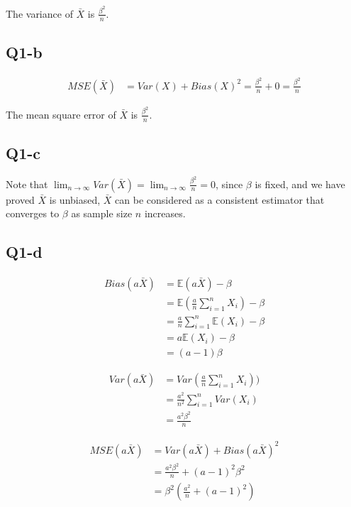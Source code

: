 \documentclass[12pt,letterpaper]{article}
\begin{document}
\noindent The variance of $\bar{X}$ is $\frac{\beta^2}{n}$.

\subsection*{Q1-b}

\begin{align*}
MSE(\bar{X}) &= Var(X) + Bias(X)^2
= \frac{\beta^2}{n} + 0 = \frac{\beta^2}{n}
\end{align*}

\noindent The mean square error of $\bar{X}$ is $\frac{\beta^2}{n}$.

\subsection*{Q1-c}

\noindent Note that $\lim_{n \to \infty} Var(\bar{X}) = \lim_{n \to \infty} \frac{\beta^2}{n} = 0$, since $\beta$ is fixed, and we have proved $\bar{X}$ is unbiased, $\bar{X}$ can be considered as a consistent estimator that converges to $\beta$ as sample size $n$ increases. 

\subsection*{Q1-d}

\begin{align*}
Bias(a \bar{X}) &= \mathbb{E}(a\bar{X}) - \beta \\
&= \mathbb{E}(\frac{a}{n} \sum_{i=1}^{n}X_i) - \beta\\
&= \frac{a}{n} \sum_{i=1}^{n} \mathbb{E}(X_i) - \beta \\
&= a \mathbb{E}(X_i) - \beta \\
&= (a - 1) \beta 
\end{align*}

\begin{align*}
Var(a \bar{X}) &= Var(\frac{a}{n} \sum_{i=1}^{n}X_i)) \\
&= \frac{a^2}{n^2} \sum_{i=1}^{n} Var(X_i) \\
&= \frac{a^2 \beta^2}{n}
\end{align*}

\begin{align*}
MSE(a \bar{X}) &=  Var(a \bar{X}) + Bias(a \bar{X})^2 \\
&= \frac{a^2 \beta^2}{n} + (a - 1)^2 \beta^2 \\
&= \beta^2 (\frac{a^2}{n} + (a-1)^2) 
\end{align*}
\end{document}
